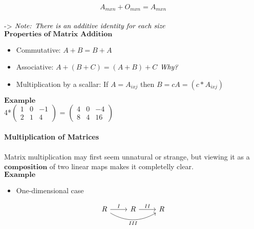 \documentclass[]{article}
\providecommand{\tightlist}{%
  \setlength{\itemsep}{0pt}\setlength{\parskip}{0pt}}
\let\oldparagraph\paragraph
\renewcommand{\paragraph}[1]{\oldparagraph{#1}\mbox{}}
\begin{document}
\[A_{mxn}+O_{mxn}=A_{mxn}\]\\

-\textgreater{}
\(\text{\textit{Note: There is an additive identity for each size}}\)\\

\(\textbf{Properties of Matrix Addition}\)\\

\begin{itemize}
\tightlist
\item
  Commutative: \(A+B = B+A\)\\
\item
  Associative: \(A+(B+C) = (A+B)+C\) \(\text{\textit{Why?}}\)\\
\item
  Multiplication by a scallar: If \(A = A_{ixj}\) then
  \(B=cA=(c*A_{ixj})\)
\end{itemize}

\(\mathbf{Example}\)\\

4*\(\begin{pmatrix} 1 & 0 & -1 \\ 2 & 1 & 4\end{pmatrix}\) =
\(\begin{pmatrix} 4 & 0 & -4 \\ 8 & 4 & 16\end{pmatrix}\)\\

\paragraph{\texorpdfstring{Multiplication of Matrices\\
}{Multiplication of Matrices }}\label{multiplication-of-matrices}

Matrix multiplication may first seem unnatural or strange, but viewing
it as a \(\textbf{composition}\) of two linear maps makes it completelly
clear.\\

\(\mathbf{Example}\)\\
 \hspace{3cm}

\begin{itemize}
\tightlist
\item
  One-dimensional case
\end{itemize}

\hspace{3cm}

\[
  \begin{tikzcd}
R\ar[r,"I"]\ar[rr,out=-30,in=210,swap,"III"] & R\ar[r,"II"] & R
\end{tikzcd}
\]
\end{document}
